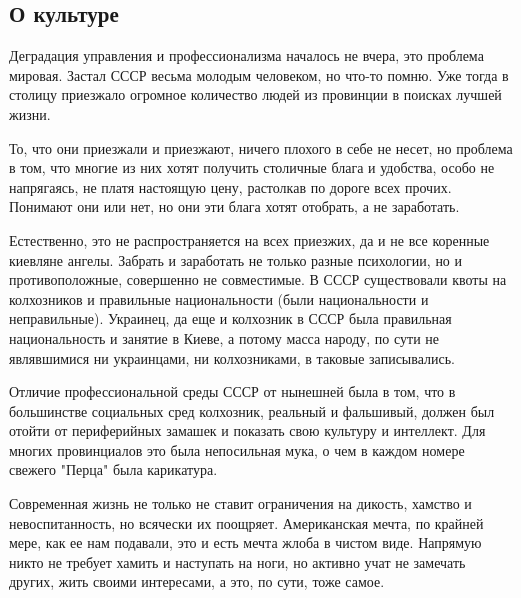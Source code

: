  
 
 

\subsection{О культуре}
\label{sec:10_11_2020.fb.denis_zharkih.2.o_kulture}

Деградация управления и профессионализма началось не вчера, это проблема
мировая. Застал СССР весьма молодым человеком, но что-то помню. Уже тогда в
столицу приезжало огромное количество людей из провинции в поисках лучшей
жизни. 

То, что они приезжали и приезжают, ничего плохого в себе не несет, но проблема
в том, что многие из них хотят получить столичные блага и удобства, особо не
напрягаясь, не платя настоящую цену, растолкав по дороге всех прочих. Понимают
они или нет, но они эти блага хотят отобрать, а не заработать. 

Естественно, это не распространяется на всех приезжих, да и не все коренные
киевляне ангелы.  Забрать и заработать не только разные психологии, но и
противоположные, совершенно не совместимые. В СССР существовали квоты на
колхозников и правильные национальности (были национальности и неправильные).
Украинец, да еще и колхозник в СССР была правильная национальность и занятие в
Киеве, а потому масса народу, по сути не являвшимися ни украинцами, ни
колхозниками, в таковые записывались. 

Отличие профессиональной среды СССР от нынешней была в том, что в большинстве
социальных сред колхозник, реальный и фальшивый, должен был отойти от
периферийных замашек и показать свою культуру и интеллект. Для многих
провинциалов это была непосильная мука, о чем в каждом номере свежего "Перца"
была карикатура. 

Современная жизнь не только не ставит ограничения на дикость, хамство и
невоспитанность, но всячески их поощряет. Американская мечта, по крайней мере,
как ее нам подавали, это и есть мечта жлоба в чистом виде. Напрямую никто не
требует хамить и наступать на ноги, но активно учат не замечать других, жить
своими интересами, а это, по сути, тоже самое. 

